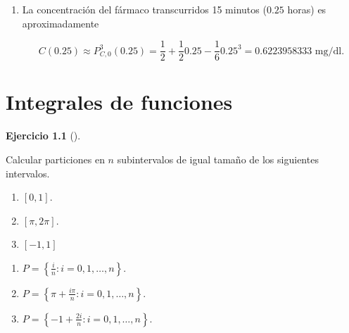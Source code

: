 \documentclass[
  spanish,
  a4paper,
]{scrreport}
\providecommand{\tightlist}{%
  \setlength{\itemsep}{0pt}\setlength{\parskip}{0pt}}
\theoremstyle{definition}
\newtheorem{exercise}{Ejercicio}[chapter]
\theoremstyle{remark}
\begin{document}
\begin{tcolorbox}
\begin{enumerate}
  Y por último, sustituyendo en la fórmula del polinomio anterior se
  tiene que

  \[
   P_{C,0}^3(t)=\frac{1}{2}+\frac{1}{2}t+0\frac{t^2}{2!}-1\frac{t^3}{3!}=\frac{1}{2}+\frac{1}{2}t-\frac{1}{6}t^3.
   \]
\item
  La concentración del fármaco transcurridos 15 minutos (\(0.25\) horas)
  es aproximadamente

  \[
   C(0.25)\approx P_{C,0}^3(0.25)= \frac{1}{2}+\frac{1}{2}0.25-\frac{1}{6}0.25^3= 0.6223958333 \mbox{ mg/dl}.
   \]
\end{enumerate}

\end{tcolorbox}


\chapter{Integrales de funciones}\label{integrales-de-funciones}

\begin{exercise}[]\protect\hypertarget{exr-particiones-intervalos}{}\label{exr-particiones-intervalos}

Calcular particiones en \(n\) subintervalos de igual tamaño de los
siguientes intervalos.

\begin{enumerate}
\def\labelenumi{\alph{enumi}.}
\tightlist
\item
  \([0,1]\).
\item
  \([\pi,2\pi]\).
\item
  \([-1, 1]\)
\end{enumerate}

\end{exercise}

\begin{tcolorbox}[enhanced jigsaw, arc=.35mm, bottomrule=.15mm, bottomtitle=1mm, breakable, colback=white, colbacktitle=quarto-callout-tip-color!10!white, colframe=quarto-callout-tip-color-frame, coltitle=black, left=2mm, leftrule=.75mm, opacityback=0, opacitybacktitle=0.6, rightrule=.15mm, title=\textcolor{quarto-callout-tip-color}{\faLightbulb}\hspace{0.5em}{Solución}, titlerule=0mm, toprule=.15mm, toptitle=1mm]

\begin{enumerate}
\def\labelenumi{\alph{enumi}.}
\tightlist
\item
  \(P = \left\{ \frac{i}{n}: i=0,1,\ldots,n\right\}\).
\item
  \(P = \left\{ \pi + \frac{i\pi}{n}: i=0,1,\ldots,n\right\}\).
\item
  \(P = \left\{ -1 + \frac{2i}{n}: i=0,1,\ldots,n\right\}\).
\end{enumerate}

\end{tcolorbox}
\end{document}

